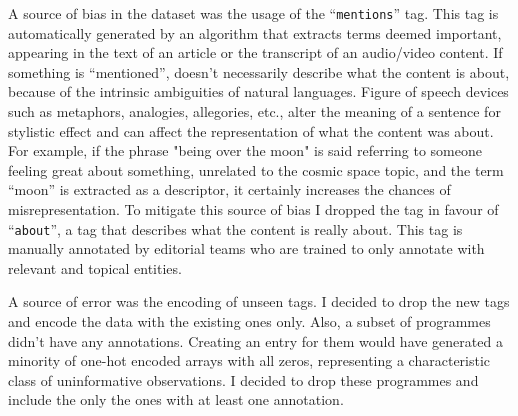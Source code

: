 A source of bias in the dataset was the usage of the ``\verb|mentions|'' tag. This tag is automatically generated by an algorithm that extracts
terms deemed important, appearing in the text of an article or the transcript of an audio/video content.
If something is ``mentioned'', doesn't necessarily describe what the content is about, because of the intrinsic ambiguities of natural languages.
Figure of speech devices such as metaphors, analogies, allegories, etc., alter the meaning of a sentence for stylistic effect and can
affect the representation of what the content was about. For example, if the phrase "being over the moon" is said referring to someone feeling great about something,
unrelated to the cosmic space topic, and the term ``moon'' is extracted as a descriptor, it certainly increases the chances of misrepresentation.
To mitigate this source of bias I dropped the tag in favour of ``\verb|about|'', a tag that describes what the content is really about.
This tag is manually annotated by editorial teams who are trained to only annotate with relevant and topical entities.

A source of error was the encoding of unseen tags. I decided to drop the new tags and encode the data with the existing ones only.
Also, a subset of programmes didn't have any annotations. Creating an entry for them would have generated a minority of one-hot encoded arrays
with all zeros, representing a characteristic class of uninformative observations. I decided to drop these programmes and include the only the ones
with at least one annotation.
